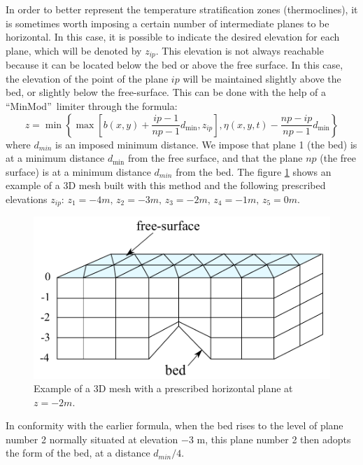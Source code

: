 In order to better represent the temperature stratification zones (thermoclines),
it is sometimes worth imposing a certain number of intermediate
planes to be horizontal. In this case, it is
possible to indicate the desired elevation for each plane, which will be
denoted by $z_{ip}$. This elevation is not always reachable because it can
be located below the bed or above the free surface. In this case, the
elevation of the point of the plane $ip$ will be maintained slightly above the
bed, or slightly below the free-surface. This can be done with the help of a
\textquotedblleft MinMod\textquotedblright\ limiter through the formula:%
\begin{equation}
z=\min\left\{  \max\left[  b(x,y)+\dfrac{ip-1}{np-1}d_{\min},z_{ip}\right]
,\eta(x,y,t)-\dfrac{np-ip}{np-1}d_{\min}\right\}
\end{equation}
where $d_{min}$ is an imposed minimum distance. We impose that plane 1 (the
bed) is at a minimum distance $d_{\min}$ from the free surface, and that
the plane $np$ (the free surface) is at a minimum distance $d_{min}$ from the bed.
The figure \ref{maillage 3D 3} shows an example of a 3D mesh built with this
method and the following prescribed elevations $z_{ip}$: $z_{1}=-4 m,\,z_{2}=-3 m,\,z_{3}%
=-2 m,\,z_{4}=-1 m,\,z_{5}=0 m$.%

\begin{figure}[tbh]%
\centering
\includegraphics[scale=0.5]{graphics/mesh_horizontal_plane.pdf}
\caption{Example of a 3D mesh with a prescribed horizontal plane at $z=-2m$.}
\label{maillage 3D 3}%
\end{figure}

In conformity with the earlier formula, when the bed rises to the level of
plane number 2 normally situated at elevation $-$3 m, this plane number 2 then
adopts the form of the bed, at a distance $d_{min}/4$.

